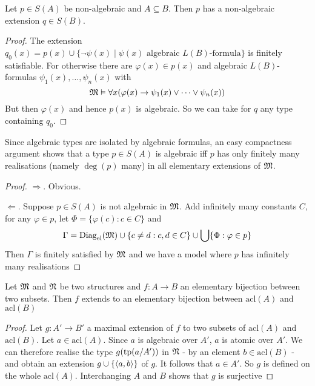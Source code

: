 \documentclass[11pt]{article}
\def \acl {\text{acl}}
\begin{document}
\begin{lemma}[]
\label{lemma5.6.2}
Let \(p\in S(A)\) be non-algebraic and \(A\subseteq B\). Then \(p\) has a non-algebraic extension \(q\in S(B)\).
\end{lemma}

\begin{proof}
The extension \(q_0(x)=p(x)\cup\{\neg\psi(x)\mid\psi(x)\text{ algebraic }L(B)\text{-formula}\}\) is finitely
satisfiable. For otherwise there are \(\varphi(x)\in p(x)\)
and algebraic \(L(B)\)-formulas \(\psi_1(x),\dots,\psi_n(x)\) with
\begin{equation*}
\mathfrak{M}\vDash\forall x(\varphi(x)\to\psi_1(x)\vee\dots\vee\psi_n(x))
\end{equation*}
But then \(\varphi(x)\)
and hence \(p(x)\) is algebraic. So we can take for \(q\) any type containing \(q_0\).
\end{proof}

\begin{remark}
\label{re5.6.3}
Since algebraic types are isolated by algebraic formulas, an easy compactness argument shows that
a type \(p\in S(A)\) is algebraic iff \(p\) has only finitely many realisations (namely \(\deg(p)\)
many) in all elementary extensions of \(\mathfrak{M}\).
\end{remark}

\begin{proof}
\(\Rightarrow\). Obvious.

\(\Leftarrow\). Suppose \(p\in S(A)\) is not algebraic in \(\mathfrak{M}\). Add infinitely many constants \(C\), for
any \(\varphi\in p\), let \(\Phi=\{\varphi(c):c\in C\}\) and
\begin{equation*}
 \Gamma=\operatorname{Diag}_{\operatorname{el}}(\mathfrak{M})\cup\{c\neq d:c,d\in C\}\cup\bigcup\{\Phi:\varphi\in p\}
\end{equation*}
Then \(\Gamma\) is finitely satisfied by \(\mathfrak{M}\) and we have a model where \(p\) has infinitely many realisations
\end{proof}

\begin{lemma}[]
\label{lemma5.6.4}
Let \(\mathfrak{M}\) and \(\mathfrak{N}\) be two structures and \(f:A\to B\) an elementary bijection between two subsets.
Then \(f\) extends to an elementary bijection between \(\acl(A)\) and \(\acl(B)\)
\end{lemma}

\begin{proof}
Let \(g:A'\to B'\) a maximal extension of \(f\) to two subsets of \(\acl(A)\) and \(\acl(B)\).
Let \(a\in \acl(A)\). Since \(a\) is algebraic over \(A'\), \(a\) is atomic over \(A'\). We can
therefore realise the type \(g(\operatorname{tp}(a/ A'))\) in \(\mathfrak{N}\) - by an element \(b\in\acl(B)\) - and obtain
an extension \(g\cup\{\langle a,b\rangle\}\) of \(g\). It follows that \(a\in A'\). So \(g\) is defined on the
whole \(\acl(A)\). Interchanging \(A\) and \(B\) shows that \(g\) is surjective
\end{proof}
\end{document}
